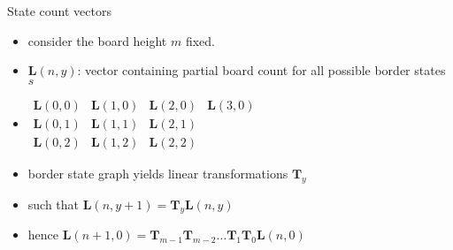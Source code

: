 \documentclass{prosper}
\newtheorem{lemma}{\sc Lemma}
\newtheorem{defin}{\sc Definition}
\newenvironment{proof}{\par \sc Proof.\rm}{\hspace*{\fill}$\bullet$\vspace{1ex}}
\newcommand{\BFL}{\mathbf{L}}
\newcommand{\BFl}{\mathbf{l}}
\newcommand{\BFT}{\mathbf{T}}
\begin{document}
%
%
%
%
%
\begin{slide}{State count vectors}
\begin{itemize}
\item consider the board height $m$ fixed.
\item $\BFL(n,y)$: vector containing partial board count for all
possible border states $s$
\item $\begin{array}{cccc}
\BFL(0,0) & \BFL(1,0) & \BFL(2,0) & \BFL(3,0) \\
\BFL(0,1) & \BFL(1,1) & \BFL(2,1) & \\
\BFL(0,2) & \BFL(1,2) & \BFL(2,2) &
\end{array}$
\item border state graph yields linear transformations $\BFT_{y}$
\item such that $\BFL(n,y+1) = \BFT_{y} \BFL(n,y)$
\item hence $\BFL(n+1,0) = \BFT_{m-1} \BFT_{m-2} \dots
        \BFT_{1} \BFT_{0} \BFL(n,0)$
\end{itemize}
\end{slide}
\end{document}
